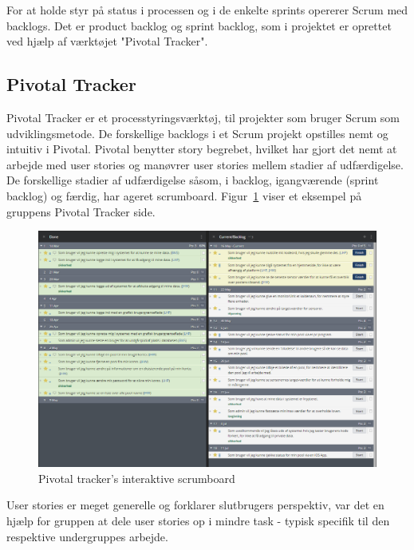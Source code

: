For at holde styr på status i processen og i de enkelte sprints opererer Scrum med backlogs. Det er product backlog og sprint backlog, som i projektet er oprettet ved hjælp af værktøjet "Pivotal Tracker". 

\subsection{Pivotal Tracker}
Pivotal Tracker er et processtyringsværktøj, til projekter som bruger Scrum som udviklingsmetode. De forskellige backlogs i et Scrum projekt opstilles nemt og intuitiv i Pivotal. Pivotal benytter story begrebet, hvilket har gjort det nemt at arbejde med user stories og manøvrer user stories mellem stadier af udfærdigelse. De forskellige stadier af udfærdigelse såsom, i backlog, igangværende (sprint backlog) og færdig, har ageret scrumboard. 
 Figur~\ref{fig:scrumboard} viser et eksempel på gruppens Pivotal Tracker side.

\begin{figure}
	\centering
	\includegraphics[width=\linewidth]{figs/processProjektGennemforsel/scrumboard.PNG}
	\caption{Pivotal tracker's interaktive scrumboard}
	\label{fig:scrumboard}
\end{figure}

 User stories er meget generelle og forklarer slutbrugers perspektiv, var det en hjælp for gruppen at dele user stories op i mindre task - typisk specifik til den respektive undergruppes arbejde. 


